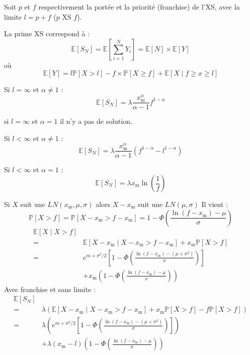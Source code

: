 \begin{f}
Soit $p$ et $f$ respectivement la portée et la priorité (franchise) de l'XS, avec la limite $l=p+f$ ($p$ XS $f$).

La prime XS correspond à :
$$
\mathbb{E}\left[S_N\right]=\mathbb{E}\left[\sum_{i=1}^{N} Y_{i}\right]=\mathbb{E}[N]\times \mathbb{E}[Y]
$$
où
$$
\mathbb{E}[Y]= l \mathbb{P}[X>l] - f \times \mathbb{P}[X\geq f] + \mathbb{E}[X\mid f\geq x\geq l]
$$


Si $l=\infty$ et $\alpha \neq 1$ :
$$
\mathbb{E}[S_N] = \lambda \frac{x_\mathrm{m}^{\alpha}}{\alpha -1}f^{1-\alpha} 
$$

si  $l=\infty$ et $\alpha = 1$ il n'y a pas de solution.

Si $l<\infty$ et $\alpha \neq 1$ :
$$
\mathbb{E}[S_N] = \lambda \frac{x_\mathrm{m}^{\alpha}}{\alpha -1}\left( f^{1-\alpha} -l^{1-\alpha} \right)
$$

Si $l<\infty$ et $\alpha = 1$ :
$$
\mathbb{E}[S_N] = \lambda x_\mathrm{m} \ln \left(  \frac{1}{f}\right)
$$


\end{f}



\begin{f}

Si $X$ suit une $LN(x_\mathrm{m}, \mu, \sigma)$ alors $X-x_\mathrm{m}$ suit une $LN(\mu, \sigma)$
Il vient :
$$
\mathbb{P}[X>f]=\mathbb{P}[X-x_\mathrm{m}>f-x_\mathrm{m}]=1-\Phi\left(\frac{\ln(f-x_\mathrm{m})-\mu}{\sigma}\right)
$$
\begin{align*}
	\mathbb{E}[X\mid X>f] \\ 
	= & \mathbb{E}\left[ X-x_\mathrm{m}\mid X-x_\mathrm{m}>f-x_\mathrm{m} \right]+x_\mathrm{m} \mathbb{P}[X>f]\\
	= & e ^{m+\sigma^2/2} \left[1-\Phi\left(\frac{\ln(f-x_\mathrm{m})-(\mu+\sigma^2)}{\sigma}\right) \right]\\
	& +x_\mathrm{m} \left( 1-\Phi\left(\frac{\ln(f-x_\mathrm{m})-\mu}{\sigma}\right) \right)
\end{align*}
Avec franchise et sans limite :
\begin{align*}
	\mathbb{E}[S_N] \\ 
	= & \lambda \left(\mathbb{E}\left[ X-x_\mathrm{m}\mid X-x_\mathrm{m}>f-x_\mathrm{m} \right]+x_\mathrm{m} \mathbb{P}[X>f]-f\mathbb{P}[X>f]\right)\\
	= & \lambda \left(  e ^{m+\sigma^2/2} \left[1-\Phi\left(\frac{\ln(f-x_\mathrm{m})-(\mu+\sigma^2)}{\sigma}\right) \right]\right)\\
	& +\lambda (x_\mathrm{m}-l) \left( 1-\Phi\left(\frac{\ln(f-x_\mathrm{m})-\mu}{\sigma}\right) \right)
\end{align*}

\end{f}